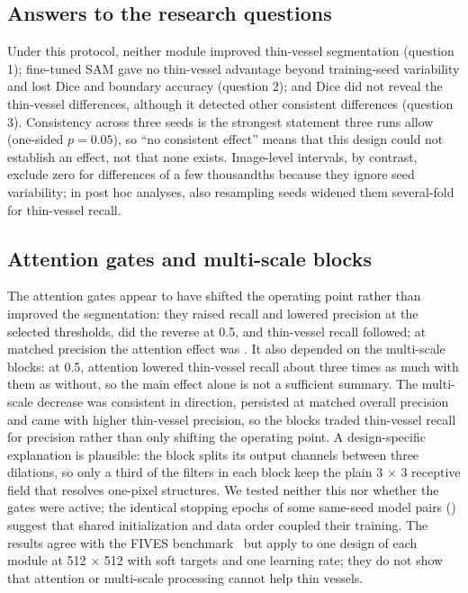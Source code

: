 \subsection*{Answers to the research questions}
Under this protocol, neither module improved thin-vessel segmentation (question 1); fine-tuned SAM gave no thin-vessel
advantage beyond training-seed variability and lost Dice and boundary accuracy (question 2); and Dice did not reveal the
thin-vessel differences, although it detected other consistent differences (question 3). Consistency across three seeds is the strongest statement three runs allow (one-sided $p = 0.05$), so
``no consistent effect'' means that this design could not establish an effect, not that none exists. Image-level
intervals, by contrast, exclude zero for differences of a few thousandths because they ignore seed variability; in post
hoc analyses, also resampling seeds widened them several-fold for thin-vessel recall.

\subsection*{Attention gates and multi-scale blocks}
The attention gates appear to have shifted the operating point rather than improved the segmentation: they raised recall
and lowered precision at the selected thresholds, did the reverse at 0.5, and thin-vessel recall followed; at matched
precision the attention effect was \PHStAttThinMatch. It also depended on the multi-scale blocks:
at 0.5, attention lowered thin-vessel recall about three times as much with them as without, so the main effect alone is
not a sufficient summary. The multi-scale decrease was consistent in direction, persisted at matched overall precision
and came with higher thin-vessel precision, so the blocks traded thin-vessel recall for precision rather than only
shifting the operating point. A design-specific explanation is plausible: the block splits its output channels between
three dilations, so only a third of the filters in each block keep the plain 3 $\times$ 3 receptive field that resolves
one-pixel structures. We tested neither this nor whether the gates were active; the identical stopping epochs of some same-seed model pairs () suggest that shared
initialization and data order coupled their training. The results agree with the FIVES benchmark~\cite{fadugba2024benchmark} but apply to one design of
each module at 512 $\times$ 512 with soft targets and one learning rate; they do not show that attention or multi-scale
processing cannot help thin vessels.

